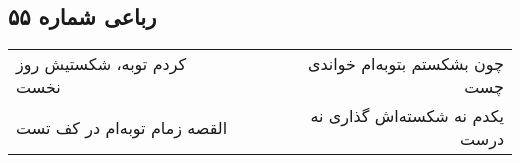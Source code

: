 \begin{center}
\section*{رباعی شماره ۵۵}
\label{sec:sh055}
\begin{longtable}{l p{0.5cm} r}
کردم توبه، شکستیش روز نخست
&&
چون بشکستم بتوبه‌ام خواندی چست
\\
القصه زمام توبه‌ام در کف تست
&&
یکدم نه شکسته‌اش گذاری نه درست
\\
\end{longtable}
\end{center}
